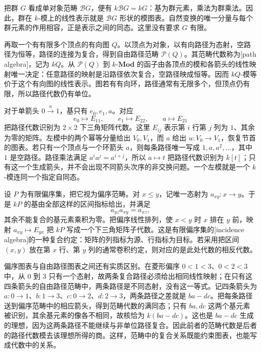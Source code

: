 把群 \(G\) 看成单对象范畴 \(\mathcal BG\)，便有 \(k\mathcal BG=kG\)：基为群元素，乘法为群乘法。因此，群在 \(k\)-模上的线性表示就是 \(\mathcal BG\) 形状的模图表。自然变换的唯一分量与每个群元素的作用相容，正是表示之间的同态。这里没有要求 \(G\) 有限。

\ProseParagraphBreak
再取一个有有限多个顶点的有向图 \(Q\)。以顶点为对象，以有向路径为态射，空路径为恒等，路径的连接为复合，得到自由路径范畴 \(\mathcal P(Q)\)。其范畴代数称为[path algebra]，记为 \(kQ\)。从 \(\mathcal P(Q)\) 到 \(k\text{-}\mathbf{Mod}\) 的函子由各顶点的模和各箭头的线性映射唯一决定：任意路径的映射是沿路径依次复合，空路径映成恒等。因而 \(kQ\)-模等价于这个有向图的线性表示。图若有有向环，路径通常有无限多个，但顶点仍有限，所以路径代数仍有单位。

\ProseParagraphBreak
对于单箭头 \(0\xrightarrow{a}1\)，基只有 \(e_0,e_1,a\)。对应
\[
	e_0\longmapsto E_{11},\qquad e_1\longmapsto E_{22},\qquad a\longmapsto E_{21}
\]
把路径代数识别为 \(2\times2\) 下三角矩阵代数。这里 \(E_{ij}\) 表示第 \(i\) 行第 \(j\) 列为 \(1\)、其余为零的矩阵。左模中的两个幂等分量给出 \(V_0,V_1\)，而 \(a\) 给出 \(u:V_0\to V_1\)，恢复节首的图表。若只有一个顶点与一个环箭头 \(a\)，则每条路径唯一写成 \(1,a,a^2,\ldots\)，其中 \(1\) 是空路径。路径乘法满足 \(a^ia^j=a^{i+j}\)，所以 \(a\mapsto t\) 把路径代数识别为 \(k[t]\)；只有这一个生成箭头，并不会出现不同箭头次序的非交换问题。一个左模就是一个 \(k\)-模连同一个指定自同态。

\ProseParagraphBreak
设 \(P\) 为有限偏序集，把它视为偏序范畴。对 \(x\le y\)，记唯一态射为 \(a_{xy}:x\to y\)。于是 \(kP\) 的基由全部这样的区间指标给出，并满足
\[
	a_{yz}a_{xy}=a_{xz},
\]
其余不能复合的基元素乘积为零。把偏序线性排列，使 \(x<y\) 时 \(x\) 排在 \(y\) 前，映射 \(a_{xy}\mapsto E_{yx}\) 把 \(kP\) 写成一个下三角矩阵子代数。这是有限偏序集的[incidence algebra]的一种复合约定：矩阵的列指标为源、行指标为目标。若采用把区间 \((x,y)\) 放在第 \(x\) 行、第 \(y\) 列的通常卷积约定，则对应的是此处代数的相反代数。

\ProseParagraphBreak
偏序图表与自由路径图表之间还有实质区别。在菱形偏序 \(0<1<3\)、\(0<2<3\) 中，从 \(0\) 到 \(3\) 只有一个态射，故两条复合路径必须给出相同线性映射；在只有这四条箭头的自由路径范畴中，两条路径是不同态射，没有这一等式。记四条箭头为 \(a:0\to1\)、\(b:1\to3\)、\(c:0\to2\)、\(d:2\to3\)，两条路径之差就是 \(ba-dc\)。把每条路径送到偏序范畴中的相应箭头，得到范畴代数的满同态；只有 \(ba,dc\) 这两个基元素被识别，其余基元素的像各不相同，故核恰为 \(k(ba-dc)\)。这也是 \(ba-dc\) 生成的理想，因为这两条路径不能继续与非单位路径复合。因此前者的范畴代数是后者的路径代数模去该理想所得的商。这样，范畴中的复合关系既能约束图表，也能写成代数中的关系。
